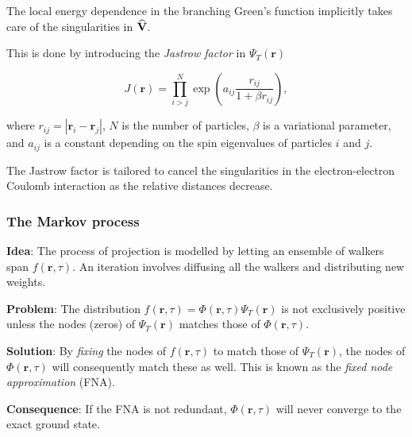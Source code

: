 \begin{frame}
 The local energy dependence in the branching Green's function implicitly takes care of the singularities in ${\bf\widehat{V}}$. 
 \shift
 
 This is done by introducing the \textit{Jastrow factor} in $\Psi_T(\mathbf{r})$
 
 \begin{equation}
  J(\mathbf{r}) = \prod_{i > j}^N \exp\left(a_{ij} \frac{r_{ij}}{1 + \beta r_{ij}}\right),
 \end{equation}
 
 where $r_{ij} = |\mathbf{r}_i - \mathbf{r}_j|$, $N$ is the number of particles, $\beta$ is a variational parameter, and $a_{ij}$ is a constant depending on the spin eigenvalues of particles $i$ and $j$.
 \shift
 
 The Jastrow factor is tailored to cancel the singularities in the electron-electron Coulomb interaction as the relative distances decrease.
 
\end{frame}


\begin{frame}

 \frametitle{The Markov process}

 \textbf{Idea}: The process of projection is modelled by letting an ensemble of walkers span $f(\mathbf{r}, \tau)$. An iteration involves diffusing all the walkers and distributing new weights. 
 \shift
 
 \textbf{Problem}: The distribution $f(\mathbf{r}, \tau) = \Phi(\mathbf{r}, \tau)\Psi_T(\mathbf{r})$ is not exclusively positive unless the nodes (zeros) of $\Psi_T(\mathbf{r})$ matches those of $\Phi(\mathbf{r}, \tau)$. 
 \shift
 
 \textbf{Solution}: By \emph{fixing} the nodes of $f(\mathbf{r}, \tau)$ to match those of $\Psi_T(\mathbf{r})$, the nodes of $\Phi(\mathbf{r}, \tau)$ will consequently match these as well. This is known as the \textit{fixed node approximation} (FNA).
 \shift
 
 \textbf{Consequence}: If the FNA is not redundant, $\Phi(\mathbf{r}, \tau)$ will never converge to the exact ground state. 
\end{frame}

